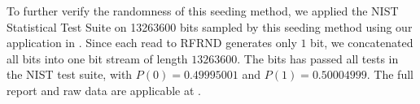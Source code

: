 To further verify the randomness of this seeding method, we applied the NIST Statistical Test Suite\cite{NISTTest} on 13263600 bits sampled by this seeding method using our application in \cite{prngtest}. Since each read to RFRND generates only $1$ bit, we concatenated all bits into one bit stream of length $13263600$. The bits has passed all tests in the NIST test suite, with $P(0) = 0.49995001$ and $P(1) = 0.50004999$. The full report and raw data are applicable at \cite{prngtest}.
